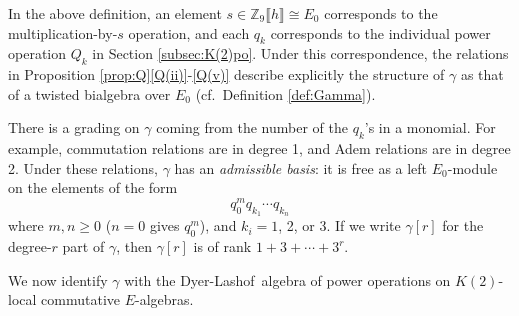 \documentclass{gtpart}
\theoremstyle{definition}
\theoremstyle{remark}
\newcommand{\mb}[1]{\mathbb{#1}}
\newcommand{\DL}{Dyer-Lashof~}
\newcommand{\BZ}{{\mb Z}}
\newcommand{\g}{\gamma}
\newcommand{\q}[1]{Proposition \ref{prop:Q}\thinspace \eqref{Q(#1)}}
\numberwithin{equation}{section}
\numberwithin{thm}{section}
\begin{document}
In the above definition, an element 
$s \in \BZ_9 \llbracket h \rrbracket \cong E_0$ corresponds to the 
multiplication-by-$s$ operation, and each $q_k$ corresponds to the 
individual power operation $Q_k$ in Section \ref{subsec:K(2)po}.  Under 
this correspondence, the relations in \q{ii}-\eqref{Q(v)} describe 
explicitly the structure of $\g$ as that of a twisted bialgebra over 
$E_0$ (cf.~Definition \ref{def:Gamma}).  

There is a grading on $\g$ coming from the number of the $q_k$'s in a 
monomial.  For example, commutation relations are in degree 1, and Adem 
relations are in degree 2.  Under these relations, $\g$ has an 
{\em admissible basis}: it is free as a left $E_0$-module on the 
elements of the form 
\begin{equation}
\label{basis}
 q_0^m q_{k_1} \cdots q_{k_n} 
\end{equation}
where $m, n \geq 0$ ($n = 0$ gives $q_0^m$), and $k_i = 1$, 2, or 3.  If 
we write $\g[r]$ for the degree-$r$ part of $\g$, then $\g[r]$ is of 
rank $1 + 3 + \cdots + 3^r$.  

We now identify $\g$ with the \DL algebra of power operations on 
$K(2)$-local commutative $E$-algebras.  
\end{document}
